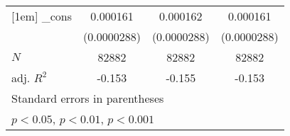 {\begin{tabular}{l*{3}{c}}
[1em]
\_cons      &    0.000161\sym{***}&    0.000162\sym{***}&    0.000161\sym{***}\\
            & (0.0000288)         & (0.0000288)         & (0.0000288)         \\
\hline
\(N\)       &       82882         &       82882         &       82882         \\
adj. \(R^{2}\)&      -0.153         &      -0.155         &      -0.153         \\
\hline\hline
\multicolumn{4}{l}{\footnotesize Standard errors in parentheses}\\
\multicolumn{4}{l}{\footnotesize \sym{*} \(p<0.05\), \sym{**} \(p<0.01\), \sym{***} \(p<0.001\)}\\
\end{tabular}
}

